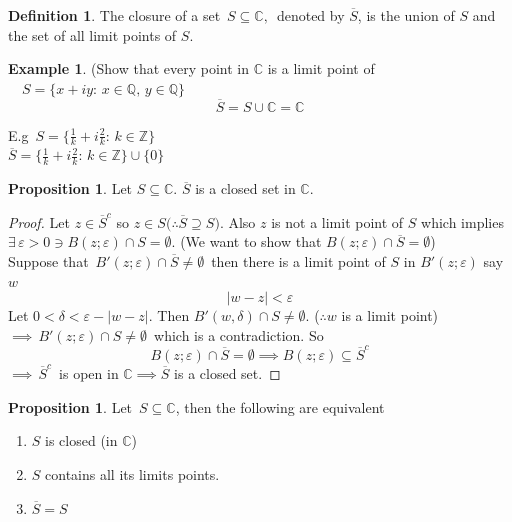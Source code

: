 \documentclass[11pt,a4paper]{article}
\theoremstyle{definition}
\newtheorem{definition}[thm]{Definition}
\newtheorem{example}[thm]{Example}
\newtheorem{proposition}[thm]{Proposition}
\begin{document}
\begin{definition}
The closure of a set $\, S\subseteq \mathbb{C},\,$ denoted by $\overline{S}$, is the union of $S$ and the set of all limit points of $S$.
\end{definition}

\begin{example}
(Show that every point in $\mathbb{C}$ is a limit point of $\quad  S = \big\{x + iy:\, x\in \mathbb{Q},\, y \in \mathbb{Q}\big\}$
$$\overline{S} = S\cup \mathbb{C} = \mathbb{C}$$

E.g $\, S = \Big\{ \frac{1}{k} + i\frac{2}{k}:\, k \in \mathbb{Z}\Big\}$\\

$\overline{S} = \Big\{ \frac{1}{k} + i\frac{2}{k}:\, k \in \mathbb{Z}\Big\}\cup \big\{0\big\}$
\end{example}

\begin{proposition}
Let $S\subseteq \mathbb{C}$. $\overline{S}$ is a closed set in $\mathbb{C}$.
\end{proposition}

\begin{proof}
Let $z\in \overline{S}^c$ so $z\in S\Big(\therefore \overline{S}\supseteq S\Big)$. Also $z$ is not a limit point of $S$ which implies\\ $\exists \, \varepsilon > 0 \ni B(z;\varepsilon) \cap S  = \emptyset$. (We want to show that $B(z;\varepsilon)\cap \overline{S} = \emptyset$)\\
Suppose that $\, B'(z; \varepsilon) \cap \overline{S}\neq \emptyset\,$ then there is a limit point of $S$ in $B'(z;\varepsilon)$ say $w$ $$\left|w - z\right| < \varepsilon$$
Let $0 < \delta < \varepsilon - \left|w - z\right|$. Then $B'(w,\delta) \cap S \neq \emptyset$. ($\therefore w$ is a limit point)\\
$\implies\, B'(z;\varepsilon) \cap S\neq \emptyset\,$ which is a contradiction.  So $$B(z;\varepsilon) \cap \overline{S} = \emptyset \implies B(z;\varepsilon) \subseteq \overline{S}^c$$
$\implies\, \overline{S}^c\,$ is open in $\mathbb{C} \implies \overline{S}$ is a closed set.
\end{proof}

\begin{proposition}
Let $\, S\subseteq \mathbb{C}$, then the following are equivalent

\begin{enumerate}
\item[(i).] $S$ is closed (in $\mathbb{C}$)
\item[(ii).] $S$ contains all its limits points.
\item[(iii).] $\overline{S} = S$\\
\end{enumerate}
\end{proposition}
\end{document}
